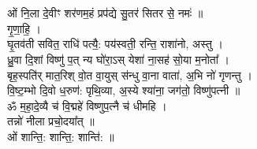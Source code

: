 \section{}
ओं नि॒ला दे॒वीꣳ शर॑णम॒हं प्रप॑द्ये सु॒तर॑ सितर से॒ नमः॑ ॥\\
गृ॒णा॒हि॒ ।\\
घृ॒तव॑ती सवित॒ राधि॑ पत्यै॒: पय॑स्वती॒ रन्ति॒ राशा॑नो, अस्तु ।\\
ध्रु॒वा दि॒शां विष्णु॑ प॒त् न्य घो॑रा॒ऽस् येशा॑ ना॒सह॑ सो॒या म॒नोता᳚ ।\\
बृह॒स्पति॑र् मात॒रिश् वो॒त वा॒युस् स॑न्धु वा॒ना वाता॑, अ॒भि नो॑ गृणन्तु ।\\
वि॒ष्ट॒म्भो दि॒वो ध॒रुण॑: पृथि॒व्या, अ॒स्ये श्या॑ना॒ जग॑तो॒ विष्णु॑पत्नी ॥\\
ॐ म॒हा॒दे॒व्यै च॑ वि॒द्महे॑ विष्णुप॒त्नै च॑ धीमहि ।\\
तन्नो॑ नीला प्रचो॒दया᳚त् ॥\\
ओं शान्ति॒: शान्ति॒: शान्ति॑: ॥\\
